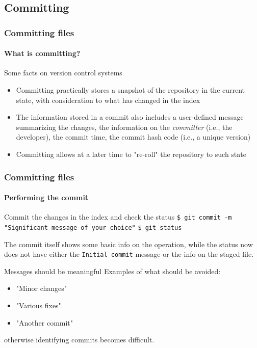 \subsection{Committing}

\begin{frame}
\frametitle{Committing files}
\framesubtitle{What is committing?}

\begin{block}{Some facts on version control systems}
\begin{itemize}
\item Committing practically stores a snapshot of the repository in the current state, with consideration to what has changed in the index
\item The information stored in a commit also includes a user-defined message summarizing the changes, the information on the {\em committer} (i.e., the developer), the commit time, the commit hash code (i.e., a unique version)
\item Committing allows at a later time to "re-roll" the repository to such state
\end{itemize}
\end{block}

\end{frame}

\begin{frame}
\frametitle{Committing files}
\framesubtitle{Performing the commit}

\begin{block}{Commit the changes in the index and check the status}
\texttt{\$ git commit -m "Significant message of your choice"}
\texttt{\$ git status}

\medskip
The commit itself shows some basic info on the operation, while the status now does not have either the \texttt{Initial commit} message or the info on the staged file.
\end{block}

\pause
\begin{block}{Messages should be meaningful}
Examples of what should be avoided:
\begin{itemize}
\item "Minor changes"
\item "Various fixes"
\item "Another commit"
\end{itemize}
otherwise identifying commits becomes difficult.
\end{block}

\end{frame}

